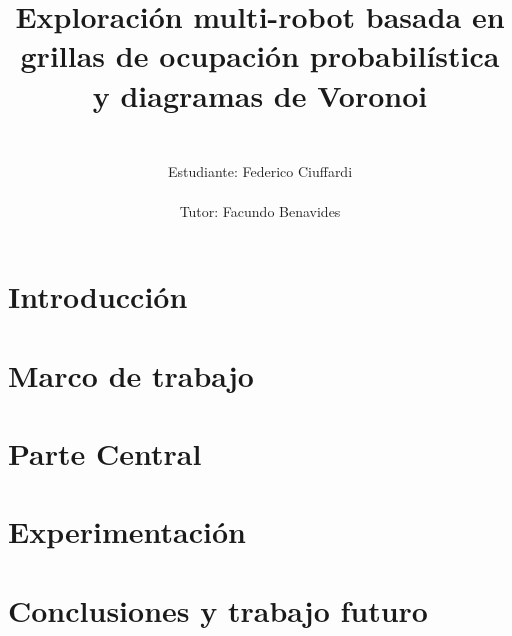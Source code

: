 \documentclass{report}
\title{%
\begin{figure}[H]
\vspace{-2.5cm}
  \subfloat{\hspace{0.075\textwidth}}
  \subfloat{\texttt{[image: logos/udelar.jpg]}}
  \subfloat{\hspace{0.2\textwidth}}
  \subfloat{\texttt{[image: logos/logo-fing.png]}}
  \subfloat{\hspace{0.2\textwidth}}
  \subfloat{\texttt{[image: logos/inco.png]}}
\end{figure}
\vspace{0.25cm}
\huge
Exploración multi-robot basada en grillas de ocupación probabilística y diagramas de Voronoi\\
}
\author{%
\Large
\vspace{0.5cm}\\
Estudiante: Federico Ciuffardi\\
\vspace{0.5cm}\\
Tutor: Facundo Benavides%
}
\date{}
\renewcommand\_{\textunderscore\allowbreak}
\begin{document}

\maketitle

\thispagestyle{empty}
\setcounter{page}{1}

\enlargethispage{1\baselineskip}
\begin{abstract} %

\end{abstract}

\hfuzz=10pt 
\glstoctrue
\tableofcontents
\hfuzz=0pt 

\listoffigures  %
\listoftables   %
\listofalgorithms %
\printnoidxglossary[nonumberlist]

\chapter{Introducción}\label{cha:Intro}
\hfuzz=10pt 
\minitoc
\hfuzz=0pt 


\chapter{Marco de trabajo}\label{cha:marco}
\hfuzz=10pt 
\minitoc
\hfuzz=0pt 



\chapter{Parte Central}\label{cha:central}
\hfuzz=10pt 
\minitoc
\hfuzz=0pt 



\chapter{Experimentación}\label{cha:exp}
\hfuzz=10pt 
\minitoc
\hfuzz=0pt 



\chapter{Conclusiones y trabajo futuro}\label{cha:concl}
\hfuzz=10pt 
\minitoc
\hfuzz=0pt 



\begin{appendices}

\end{appendices}



\end{document}
